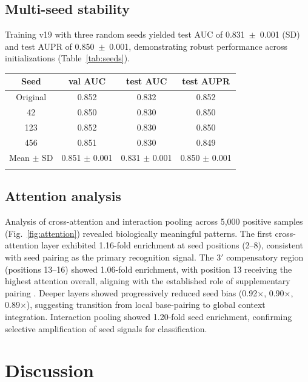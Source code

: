 \documentclass[unnumsec,webpdf,contemporary,large]{oup-authoring-template}
\begin{document}
\subsection{Multi-seed stability}

Training v19 with three random seeds yielded test AUC of 0.831~$\pm$~0.001 (SD) and test AUPR of 0.850~$\pm$~0.001, demonstrating robust performance across initializations (Table~\ref{tab:seeds}).

\begin{table}[!t]
{\begin{tabular}{@{}cccc@{}}
\toprule
Seed & val AUC & test AUC & test AUPR \\
\midrule
Original & 0.852 & 0.832 & 0.852 \\
42 & 0.850 & 0.830 & 0.850 \\
123 & 0.852 & 0.830 & 0.850 \\
456 & 0.851 & 0.830 & 0.849 \\
\midrule
Mean $\pm$ SD & 0.851 $\pm$ 0.001 & 0.831 $\pm$ 0.001 & 0.850 $\pm$ 0.001 \\
\botrule
\end{tabular}}{}
\end{table}

\subsection{Attention analysis}

Analysis of cross-attention and interaction pooling across 5,000 positive samples (Fig.~\ref{fig:attention}) revealed biologically meaningful patterns. The first cross-attention layer exhibited 1.16-fold enrichment at seed positions (2--8), consistent with seed pairing as the primary recognition signal. The 3$'$ compensatory region (positions 13--16) showed 1.06-fold enrichment, with position 13 receiving the highest attention overall, aligning with the established role of supplementary pairing \citep{grimson2007}. Deeper layers showed progressively reduced seed bias (0.92$\times$, 0.90$\times$, 0.89$\times$), suggesting transition from local base-pairing to global context integration. Interaction pooling showed 1.20-fold seed enrichment, confirming selective amplification of seed signals for classification.

\section{Discussion}
\end{document}
